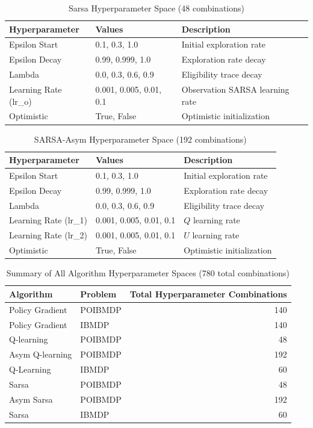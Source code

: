 \begin{table}[h]
\centering
\caption{Sarsa Hyperparameter Space (48 combinations)}
\begin{tabular}{lll}
\toprule
\textbf{Hyperparameter} & \textbf{Values} & \textbf{Description} \\
\midrule
Epsilon Start & 0.1, 0.3, 1.0 & Initial exploration rate \\
Epsilon Decay & 0.99, 0.999, 1.0 & Exploration rate decay \\
Lambda & 0.0, 0.3, 0.6, 0.9 & Eligibility trace decay \\
Learning Rate (lr\_o) & 0.001, 0.005, 0.01, 0.1 & Observation SARSA learning rate \\
Optimistic & True, False & Optimistic initialization \\
\bottomrule
\end{tabular}
\end{table}

\begin{table}[h]
\centering
\caption{SARSA-Asym Hyperparameter Space (192 combinations)}
\begin{tabular}{lll}
\toprule
\textbf{Hyperparameter} & \textbf{Values} & \textbf{Description} \\
\midrule
Epsilon Start & 0.1, 0.3, 1.0 & Initial exploration rate \\
Epsilon Decay & 0.99, 0.999, 1.0 & Exploration rate decay \\
Lambda & 0.0, 0.3, 0.6, 0.9 & Eligibility trace decay \\
Learning Rate (lr\_1) & 0.001, 0.005, 0.01, 0.1 & $Q$ learning rate \\
Learning Rate (lr\_2) & 0.001, 0.005, 0.01, 0.1 & $U$ learning rate \\
Optimistic & True, False & Optimistic initialization \\
\bottomrule
\end{tabular}
\end{table}

\begin{table}[h]
    \centering
    \caption{Summary of All Algorithm Hyperparameter Spaces (780 total combinations)}
    \begin{tabular}{llr}
    \toprule
    \textbf{Algorithm} & \textbf{Problem} & \textbf{Total Hyperparameter Combinations} \\
    \midrule
    Policy Gradient & POIBMDP & 140 \\
    Policy Gradient & IBMDP & 140 \\
    Q-learning & POIBMDP &48 \\
    Asym Q-learning & POIBMDP & 192 \\
    Q-Learning & IBMDP & 60 \\
    Sarsa & POIBMDP & 48 \\
    Asym Sarsa & POIBMDP & 192 \\
    Sarsa & IBMDP & 60 \\
    \bottomrule
    \end{tabular}
    \end{table}

